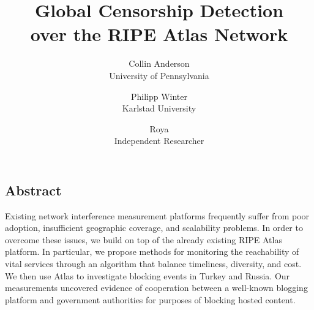 \documentclass[letterpaper,twocolumn,10pt]{article}
\begin{document}
\date{}

\title{
	\Large \bf Global Censorship Detection \\
	over the RIPE Atlas Network
}

\author{
	{\rm Collin Anderson} \\
	University of Pennsylvania
	\and
	{\rm Philipp Winter} \\
	Karlstad University
	\and
	{\rm Roya} \\
	Independent Researcher
}

\maketitle

\thispagestyle{empty}

\subsection*{Abstract}

Existing network interference measurement platforms frequently suffer from poor adoption,
insufficient geographic coverage, and scalability problems.  In order to
overcome these issues, we build on top of the already existing RIPE Atlas
platform.  In particular, we propose methods for monitoring the reachability of
vital services through an algorithm that balance timeliness, diversity, and
cost.  We then use Atlas to investigate blocking events in Turkey and Russia.
Our measurements uncovered evidence of cooperation between a well-known
blogging platform and government authorities for purposes of blocking hosted
content.













\raggedright
\printbibliography

\end{document}
